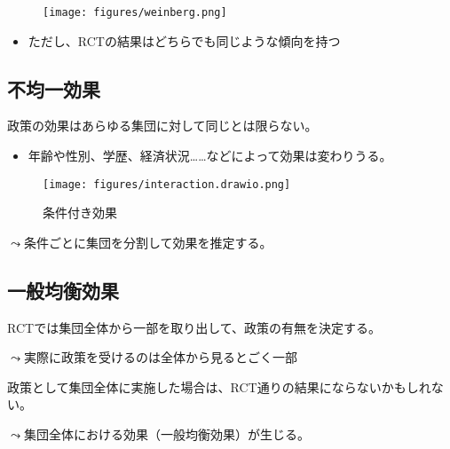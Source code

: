 \documentclass[
  xelatex,
  ja=standard]{bxjsarticle}
\providecommand{\tightlist}{%
  \setlength{\itemsep}{0pt}\setlength{\parskip}{0pt}}\usepackage{longtable,booktabs,array}
\begin{document}
\begin{figure}[htpb]

{\centering \texttt{[image: figures/weinberg.png]}

}

\caption{\citet{weinberg2014}}

\end{figure}

\begin{itemize}
\tightlist
\item
  ただし、RCTの結果はどちらでも同じような傾向を持つ\citep{weinberg2014}
\end{itemize}

\hypertarget{ux4e0dux5747ux4e00ux52b9ux679c}{%
\subsection{不均一効果}\label{ux4e0dux5747ux4e00ux52b9ux679c}}

政策の効果はあらゆる集団に対して同じとは限らない。

\begin{itemize}
\tightlist
\item
  年齢や性別、学歴、経済状況\ldots\ldots などによって効果は変わりうる。
\end{itemize}

\begin{figure}[htpb]

{\centering \texttt{[image: figures/interaction.drawio.png]}

}

\caption{条件付き効果}

\end{figure}

\(\leadsto\)条件ごとに集団を分割して効果を推定する。

\hypertarget{ux4e00ux822cux5747ux8861ux52b9ux679c}{%
\subsection{一般均衡効果}\label{ux4e00ux822cux5747ux8861ux52b9ux679c}}

RCTでは集団全体から一部を取り出して、政策の有無を決定する。

\(\leadsto\)実際に政策を受けるのは全体から見るとごく一部

政策として集団全体に実施した場合は、RCT通りの結果にならないかもしれない。

\(\leadsto\)集団全体における効果（一般均衡効果）が生じる。
\end{document}
